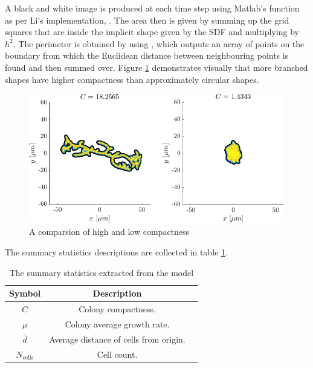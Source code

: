 A black and white image 
is produced at each time step using Matlab's function  as per
Li's implementation, \cite{li2024off}. The area then is given by summing up the grid squares that are
inside the implicit shape given by the SDF and multiplying by $h^2$. The perimeter
is obtained by using , which outputs an array of points on the boundary
from which the Euclidean distance between neighbouring points is found and then summed over.
Figure \ref{fig:compactness_comparison} demonstrates visually that more branched shapes 
have higher compactness than approximately circular shapes.
\begin{figure}[!htb]
    \centering
    \includegraphics[width=\textwidth]{chapter2/figures/compareCompactness.pdf}
    \caption{A comparsion of high and low compactness}
    \label{fig:compactness_comparison}
\end{figure}
The summary statistics descriptions are collected in table \ref{table:summaryStats}.
\begin{table}[!htb]
\begin{center}
    \begin{tabular}{ |c|c|c| } 
     \hline
      \textbf{Symbol} & \textbf{Description} \\ 
      \hline
     $C$                 &  Colony compactness. \\ 
     $\mu$               & Colony average growth rate. \\ 
     $\bar{d}$           &   Average distance of cells from origin. \\ 
     $N_{\textrm{cells}}$ & Cell count. \\
     \hline   
    \end{tabular}   
\end{center}
\caption{The summary statistics extracted from the model}
\label{table:summaryStats}
\end{table}












